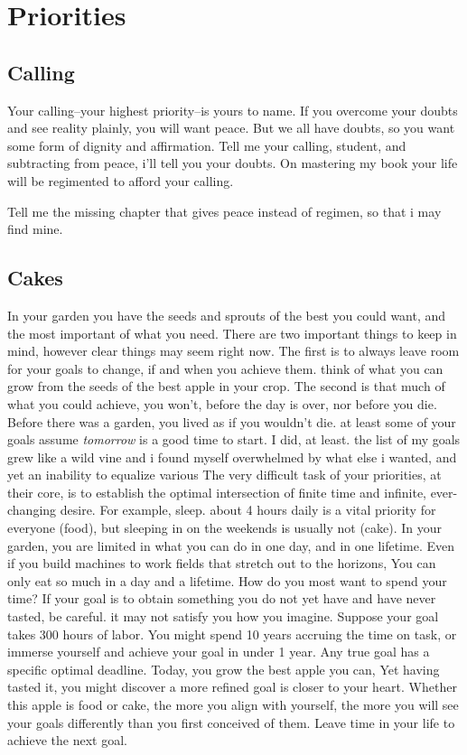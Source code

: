 \documentclass[
]{book}
\begin{document}
\chapter{Priorities}\label{priorities}

\section{Calling}\label{calling}

Your calling--your highest priority--is yours to name.
If you overcome your doubts and see reality plainly, you will want peace.
But we all have doubts, so you want some form of dignity and affirmation.
Tell me your calling, student, and subtracting from peace, i'll tell you your doubts.
On mastering my book your life will be regimented to afford your calling.

Tell me the missing chapter that gives peace instead of regimen, so that i may find mine.

\section{Cakes}\label{cakes}

In your garden you have the seeds and sprouts of the best you could want, and the most important of what you need.
There are two important things to keep in mind, however clear things may seem right now.
The first is to always leave room for your goals to change, if and when you achieve them. think of what you can grow from the seeds of the best apple in your crop.
The second is that much of what you could achieve, you won't, before the day is over, nor before you die.
Before there was a garden, you lived as if you wouldn't die. at least some of your goals assume \emph{tomorrow} is a good time to start.
I did, at least. the list of my goals grew like a wild vine and i found myself overwhelmed by what else i wanted, and yet an inability to equalize various
The very difficult task of your priorities, at their core, is to establish the optimal intersection of finite time and infinite, ever-changing desire.
For example, sleep. about 4 hours daily is a vital priority for everyone (food), but sleeping in on the weekends is usually not (cake).
In your garden, you are limited in what you can do in one day, and in one lifetime.
Even if you build machines to work fields that stretch out to the horizons,
You can only eat so much in a day and a lifetime.
How do you most want to spend your time?
If your goal is to obtain something you do not yet have and have never tasted, be careful. it may not satisfy you how you imagine.
Suppose your goal takes 300 hours of labor.
You might spend 10 years accruing the time on task, or immerse yourself and achieve your goal in under 1 year.
Any true goal has a specific optimal deadline.
Today, you grow the best apple you can,
Yet having tasted it, you might discover a more refined goal is closer to your heart.
Whether this apple is food or cake, the more you align with yourself, the more you will see your goals differently than you first conceived of them.
Leave time in your life to achieve the next goal.
\end{document}
